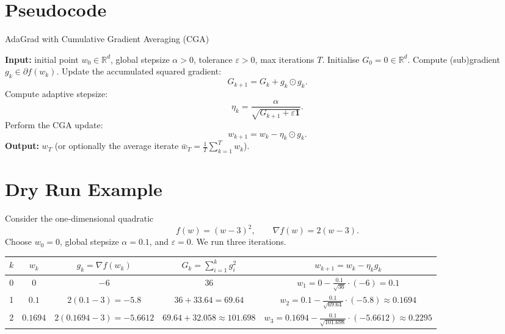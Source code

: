 \documentclass{article}
\begin{document}
\section*{Pseudocode}
\begin{algorithm}[H]
\caption{AdaGrad with Cumulative Gradient Averaging (CGA)}
\begin{algorithmic}[1]
\STATE \textbf{Input:} initial point $w_{0}\in\mathbb{R}^{d}$,
global stepsize $\alpha>0$, tolerance $\varepsilon>0$, max iterations $T$.
\STATE Initialise $G_{0}=0\in\mathbb{R}^{d}$.
    \STATE Compute (sub)gradient $g_{k}\in\partial f(w_{k})$.
    \STATE Update the accumulated squared gradient:
    \[
    G_{k+1}=G_{k}+g_{k}\odot g_{k}.
    \] \hfill  {}
    \STATE Compute adaptive stepsize:
    \[
    \eta_{k}= \frac{\alpha}{\sqrt{G_{k+1}+\varepsilon\mathbf{1}}}.
    \]
    \STATE Perform the CGA update:
    \[
    w_{k+1}= w_{k}-\eta_{k}\odot g_{k}.
    \]
\ENDFOR
\STATE \textbf{Output:} $w_{T}$ (or optionally the average iterate
$\bar w_{T}= \frac{1}{T}\sum_{k=1}^{T}w_{k}$).
\end{algorithmic}
\end{algorithm}

\section*{Dry Run Example}
Consider the one‑dimensional quadratic
\[
f(w)=(w-3)^{2},\qquad \nabla f(w)=2(w-3).
\]
Choose $w_{0}=0$, global stepsize $\alpha=0.1$, and $\varepsilon=0$.
We run three iterations.

\begin{center}
\begin{tabular}{c|c|c|c|c}
$k$ & $w_{k}$ & $g_{k}= \nabla f(w_{k})$ & $G_{k}= \sum_{i=1}^{k}g_{i}^{2}$ & $w_{k+1}=w_{k}-\eta_{k}g_{k}$\\ \hline
0 & $0$ & $-6$ & $36$ & $\displaystyle w_{1}=0-\frac{0.1}{\sqrt{36}}\cdot(-6)=0.1$\\[4pt]
1 & $0.1$ & $2(0.1-3)=-5.8$ & $36+33.64=69.64$ & $\displaystyle w_{2}=0.1-\frac{0.1}{\sqrt{69.64}}\cdot(-5.8)\approx0.1694$\\[4pt]
2 & $0.1694$ & $2(0.1694-3)=-5.6612$ &
$69.64+32.058\approx101.698$ &
$\displaystyle w_{3}=0.1694-\frac{0.1}{\sqrt{101.698}}\cdot(-5.6612)\approx0.2295$
\end{tabular}
\end{center}
\end{document}
